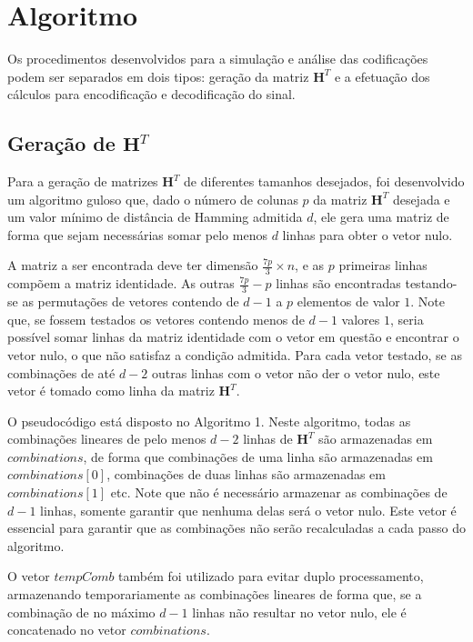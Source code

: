 \section{Algoritmo}

Os procedimentos desenvolvidos para a simulação e análise das codificações podem ser separados em dois tipos: geração da matriz $\textbf{H}^T$ e a efetuação dos cálculos para encodificação e decodificação do sinal.

\subsection{Geração de $\textbf{H}^T$}
Para a geração de matrizes $\textbf{H}^T$ de diferentes tamanhos desejados, foi desenvolvido um algoritmo guloso que, dado o número de colunas $p$ da matriz $\textbf{H}^T$ desejada e um valor mínimo de distância de Hamming admitida $d$, ele gera uma matriz de forma que sejam necessárias somar pelo menos $d$ linhas para obter o vetor nulo. 

A matriz a ser encontrada deve ter dimensão $\frac{7p}{3} \times n$, e as $p$ primeiras linhas compõem a matriz identidade. As outras $\frac{7p}{3} - p$ linhas são encontradas testando-se as permutações de vetores contendo de $d - 1$ a $p$ elementos de valor $1$. Note que, se fossem testados os vetores contendo menos de $d - 1$ valores $1$, seria possível somar linhas da matriz identidade com o vetor em questão e encontrar o vetor nulo, o que não satisfaz a condição admitida. Para cada vetor testado, se as combinações de até $d - 2$ outras linhas com o vetor não der o vetor nulo, este vetor é tomado como linha da matriz $\textbf{H}^T$.

O pseudocódigo está disposto no Algoritmo 1. Neste algoritmo, todas as combinações lineares de pelo menos $d - 2$ linhas de $\textbf{H}^T$ são armazenadas em $combinations$, de forma que combinações de uma linha são armazenadas em $combinations[0]$, combinações de duas linhas são armazenadas em $combinations[1]$ etc. Note que não é necessário armazenar as combinações de $d - 1$ linhas, somente garantir que nenhuma delas será o vetor nulo. Este vetor é essencial para garantir que as combinações não serão recalculadas a cada passo do algoritmo.

O vetor $tempComb$ também foi utilizado para evitar duplo processamento, armazenando temporariamente as combinações lineares de forma que, se a combinação de no máximo $d - 1$ linhas não resultar no vetor nulo, ele é concatenado no vetor $combinations$. 

